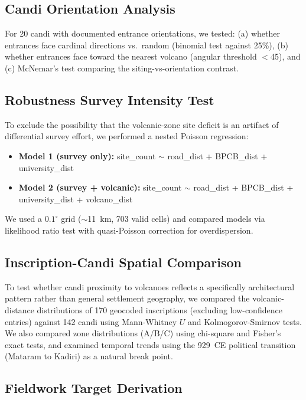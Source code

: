 \documentclass[12pt,a4paper]{article}
\begin{document}
\subsection{Candi Orientation Analysis}
\label{sec:orientation}

For 20 candi with documented entrance orientations, we tested: (a) whether entrances face cardinal directions vs.\ random (binomial test against 25\%), (b) whether entrances face toward the nearest volcano (angular threshold $<$45\textdegree), and (c) McNemar's test comparing the siting-vs-orientation contrast.

\subsection{Robustness Survey Intensity Test}
\label{sec:adv3}

To exclude the possibility that the volcanic-zone site deficit is an artifact of differential survey effort, we performed a nested Poisson regression:
\begin{itemize}
    \item \textbf{Model 1 (survey only):} site\_count $\sim$ road\_dist + BPCB\_dist + university\_dist
    \item \textbf{Model 2 (survey + volcanic):} site\_count $\sim$ road\_dist + BPCB\_dist + university\_dist + volcano\_dist
\end{itemize}
We used a $0.1^{\circ}$ grid ($\sim$11~km, 703 valid cells) and compared models via likelihood ratio test with quasi-Poisson correction for overdispersion.

\subsection{Inscription-Candi Spatial Comparison}
\label{sec:inscr_method}

To test whether candi proximity to volcanoes reflects a specifically architectural pattern rather than general settlement geography, we compared the volcanic-distance distributions of 170 geocoded inscriptions (excluding low-confidence entries) against 142 candi using Mann-Whitney $U$ and Kolmogorov-Smirnov tests. We also compared zone distributions (A/B/C) using chi-square and Fisher's exact tests, and examined temporal trends using the 929~CE political transition (Mataram to Kadiri) as a natural break point.

\subsection{Fieldwork Target Derivation}
\label{sec:targets}
\end{document}
